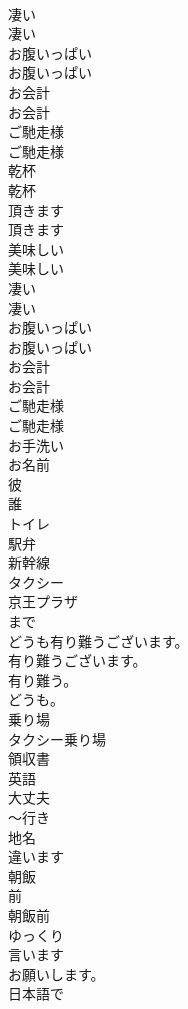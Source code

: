 \documentclass[8pt]{extreport}
\begin{document}
\begin{CJK}{UTF8}{min}
\\	凄い	
\\	凄い 
\\	お腹いっぱい	
\\	お腹いっぱい 
\\	お会計	
\\	お会計 
\\	ご馳走様	
\\	ご馳走様 
\\	乾杯	
\\	乾杯 
\\	頂きます	
\\	頂きます 
\\	美味しい	
\\	美味しい 
\\	凄い	
\\	凄い 
\\	お腹いっぱい	
\\	お腹いっぱい 
\\	お会計	
\\	お会計 
\\	ご馳走様	
\\	ご馳走様 
\\	お手洗い
\\	お名前
\\	彼
\\	誰
\\	トイレ
\\	駅弁
\\	新幹線
\\	タクシー
\\	京王プラザ
\\	まで
\\	どうも有り難うございます。
\\	有り難うございます。
\\	有り難う。
\\	どうも。
\\	乗り場
\\	タクシー乗り場
\\	領収書
\\	英語
\\	大丈夫
\\	～行き
\\	地名
\\	違います
\\	朝飯
\\	前
\\	朝飯前
\\	ゆっくり
\\	言います
\\	お願いします。
\\	日本語で

\end{CJK}
\end{document}
